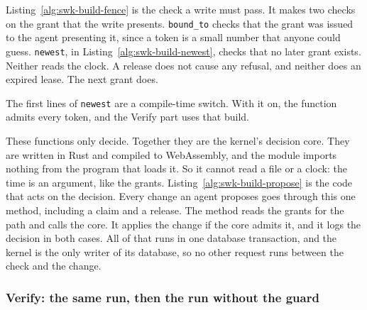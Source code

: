 Listing~\ref{alg:swk-build-fence} is the check a write must pass. It makes two
checks on the grant that the write presents. \texttt{bound\_to} checks
that the grant was issued to the agent presenting it, since a token is a
small number that anyone could guess. \texttt{newest}, in
Listing~\ref{alg:swk-build-newest}, checks that no later grant exists.
Neither reads the clock. A release does not cause any refusal, and neither
does an expired lease. The next grant does.



The first lines of \texttt{newest} are a compile-time switch. With it on,
the function admits every token, and the Verify part uses that build.

These functions only decide. Together they are the kernel's decision core.
They are written in Rust and compiled to WebAssembly, and the module
imports nothing from the program that loads it. So it cannot read a file or a
clock: the time is an argument, like the grants.
Listing~\ref{alg:swk-build-propose} is the code that acts on the decision.
Every change an agent proposes goes through this one method, including a
claim and a release. The method reads the grants for the path and calls the
core. It applies the change if the core admits it, and it logs the decision
in both cases. All of that runs in one database transaction, and the
kernel is the only writer of its database, so no other request runs
between the check and the change.



\subsubsection{Verify: the same run, then the run without the guard}

